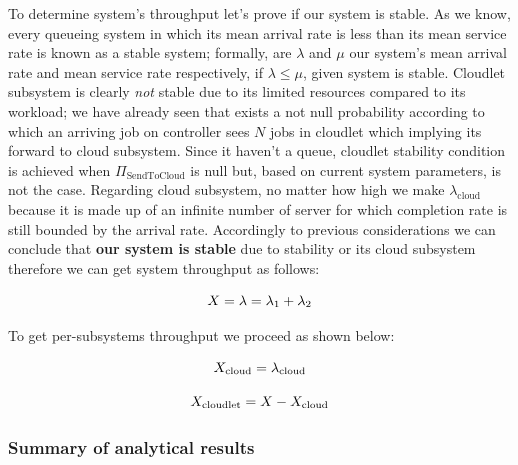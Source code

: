 \documentclass[10pt,a4paper]{article}
\begin{document}
To determine system's throughput let's prove if our system is stable.
As we know, every queueing system in which its mean arrival rate is less than its mean service rate is known as a stable system; formally, are $\lambda$ and $\mu$ our system's mean arrival rate and mean service rate respectively, if $\lambda \leq \mu$, given system is stable.
Cloudlet subsystem is clearly \textit{not} stable due to its limited resources compared to its workload; we have already seen that exists a not null probability according to which an arriving job on controller sees $N$ jobs in cloudlet which implying its forward to cloud subsystem. Since it haven't a queue, cloudlet stability condition is achieved when $\Pi_{\text{SendToCloud}}$ is null but, based on current system parameters, is not the case.
Regarding cloud subsystem, no matter how high we make $\lambda_{\text{cloud}}$ because it is made up of an infinite number of server for which completion rate is still bounded by the arrival rate.
Accordingly to previous considerations we can conclude that \textbf{our system is stable} due to stability or its cloud subsystem therefore we can get system throughput as follows:

\begin{equation}
X = \lambda = \lambda_1 + \lambda_2 \\
\end{equation}

To get per-subsystems throughput we proceed as shown below:

\begin{equation}
X_{\text{cloud}} = \lambda_{\text{cloud}} \\
\end{equation}

\begin{equation}
X_{\text{cloudlet}} = X - X_{\text{cloud}} \\
\end{equation}

\subsubsection{Summary of analytical results}
\end{document}
